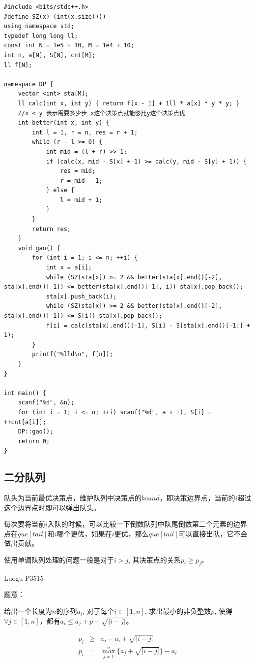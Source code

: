 \begin{lstlisting}
#include <bits/stdc++.h>
#define SZ(x) (int(x.size()))
using namespace std;
typedef long long ll;
const int N = 1e5 + 10, M = 1e4 + 10; 
int n, a[N], S[N], cnt[M];
ll f[N];

namespace DP {
	vector <int> sta[M]; 
	ll calc(int x, int y) { return f[x - 1] + 1ll * a[x] * y * y; }
	//x < y 表示需要多少步 x这个决策点就能够比y这个决策点优
	int better(int x, int y) {
		int l = 1, r = n, res = r + 1;
		while (r - l >= 0) {
			int mid = (l + r) >> 1;
			if (calc(x, mid - S[x] + 1) >= calc(y, mid - S[y] + 1)) { 
				res = mid;
				r = mid - 1;
			} else {
				l = mid + 1;
			}
		}
		return res;
	}
	void gao() {
		for (int i = 1; i <= n; ++i) {
			int x = a[i];
			while (SZ(sta[x]) >= 2 && better(sta[x].end()[-2], sta[x].end()[-1]) <= better(sta[x].end()[-1], i)) sta[x].pop_back();
			sta[x].push_back(i);
			while (SZ(sta[x]) >= 2 && better(sta[x].end()[-2], sta[x].end()[-1]) <= S[i]) sta[x].pop_back();
			f[i] = calc(sta[x].end()[-1], S[i] - S[sta[x].end()[-1]] + 1);
		}
		printf("%lld\n", f[n]);
	}
}

int main() {
	scanf("%d", &n);
	for (int i = 1; i <= n; ++i) scanf("%d", a + i), S[i] = ++cnt[a[i]]; 
	DP::gao();
	return 0;
}
\end{lstlisting}

\subsection{二分队列}

队头为当前最优决策点，维护队列中决策点的$bound$，即决策边界点，当前的$i$超过这个边界点时即可以弹出队头。\par
每次要将当前$i$入队的时候，可以比较一下倒数队列中队尾倒数第二个元素的边界点在$que[tail]$和$i$哪个更优，如果在$i$更优，那么$que[tail]$可以直接出队，它不会做出贡献。\par

使用单调队列处理的问题一般是对于$i > j$, 其决策点的关系$p_i \geq p_j$。

Luogu P3515\par
题意：\par

给出一个长度为$n$的序列$a_i$, 对于每个$i \in [1, n]$, 求出最小的非负整数$p$, 使得$\forall j \in [1, n]$，都有$\displaystyle a_i \leq a_j + p - \sqrt{|i - j|}$。\par

\begin{eqnarray*}
p_i &\geq& a_j - a_i + \sqrt{|i - j|} \\
p_i &=& \max\limits_{j=1}^n\{a_j+\sqrt{|i-j|}\}-a_i
\end{eqnarray*}

